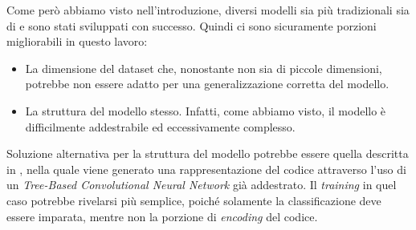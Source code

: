 Come però abbiamo visto nell'introduzione, diversi modelli sia più tradizionali sia di \ML{} e \DL{} sono stati sviluppati con successo. 
Quindi ci sono sicuramente porzioni migliorabili in questo lavoro:
    \begin{itemize}
        \item La dimensione del dataset che, nonostante non sia di piccole dimensioni, potrebbe non essere adatto per una generalizzazione corretta del modello.
        \item La struttura del modello stesso. Infatti, come abbiamo visto, il modello è difficilmente addestrabile ed eccessivamente complesso.
    \end{itemize}
Soluzione alternativa per la struttura del modello potrebbe essere quella descritta in \cite{bui2021infercode}, nella quale viene generato una rappresentazione del codice attraverso l'uso di un \textit{Tree-Based Convolutional Neural Network} già addestrato. 
Il \textit{training} in quel caso potrebbe rivelarsi più semplice, poiché solamente la classificazione deve essere imparata, mentre non la porzione di \textit{encoding} del codice. 